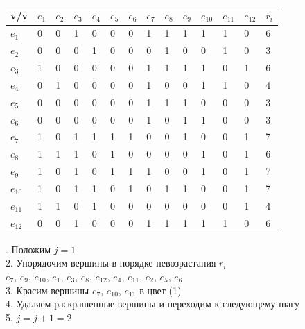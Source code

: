 \documentclass[a4paper,12pt]{article}
\begin{document}
\begin{table}[H]
    \centering
    \begin{tabular}{|l|l|l|l|l|l|l|l|l|l|l|l|l|l|}
    \hline
        v/v & $e_1$ & $e_2$ & $e_3$ & $e_4$ & $e_5$ & $e_6$ & $e_7$ & $e_8$ & $e_9$ & $e_{10}$ & $e_{11}$ & $e_{12}$ & $r_i$ \\ \hline
        $e_1$ & 0 & 0 & 1 & 0 & 0 & 0 & 1 & 1 & 1 & 1 & 1 & 0 & 6 \\ \hline
        $e_2$ & 0 & 0 & 0 & 1 & 0 & 0 & 0 & 1 & 0 & 0 & 1 & 0 & 3 \\ \hline
        $e_3$ & 1 & 0 & 0 & 0 & 0 & 0 & 1 & 1 & 1 & 1 & 0 & 1 & 6 \\ \hline
        $e_4$ & 0 & 1 & 0 & 0 & 0 & 0 & 1 & 0 & 0 & 1 & 1 & 0 & 4 \\ \hline
        $e_5$ & 0 & 0 & 0 & 0 & 0 & 0 & 1 & 1 & 1 & 0 & 0 & 0 & 3 \\ \hline
        $e_6$ & 0 & 0 & 0 & 0 & 0 & 0 & 1 & 0 & 1 & 1 & 0 & 0 & 3 \\ \hline
        $e_7$ & 1 & 0 & 1 & 1 & 1 & 1 & 0 & 0 & 1 & 0 & 0 & 1 & 7 \\ \hline
        $e_8$ & 1 & 1 & 1 & 0 & 1 & 0 & 0 & 0 & 0 & 1 & 0 & 1 & 6 \\ \hline
        $e_9$ & 1 & 0 & 1 & 0 & 1 & 1 & 1 & 0 & 0 & 1 & 0 & 1 & 7 \\ \hline
        $e_{10}$ & 1 & 0 & 1 & 1 & 0 & 1 & 0 & 1 & 1 & 0 & 0 & 1 & 7 \\ \hline
        $e_{11}$ & 1 & 1 & 0 & 1 & 0 & 0 & 0 & 0 & 0 & 0 & 0 & 1 & 4 \\ \hline
        $e_{12}$ & 0 & 0 & 1 & 0 & 0 & 0 & 1 & 1 & 1 & 1 & 1 & 0 & 6 \\ \hline
    \end{tabular}
\end{table}
. Положим $j = 1$ \\
2. Упорядочим вершины в порядке невозрастания $r_i$ \\
$e_7$, $e_9$, $e_{10}$, $e_1$, $e_3$, $e_8$, $e_{12}$, $e_4$, $e_{11}$, $e_2$, $e_5$, $e_6$ \\
3. Красим вершины $e_7$, $e_{10}$, $e_{11}$ в цвет (1) \\
4. Удаляем раскрашенные вершины и переходим к следующему шагу \\
5. $j = j + 1 = 2$ \\
\end{document}
